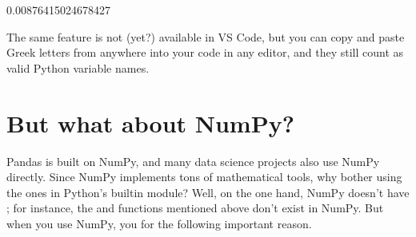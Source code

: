 \documentclass[letterpaper,10pt,english]{jupyterBook}
\begin{document}
\begin{sphinxVerbatim}[commandchars=\\\{\}]
0.00876415024678427
\end{sphinxVerbatim}

\sphinxAtStartPar
The same feature is not (yet?) available in VS Code, but you can copy and paste Greek letters from anywhere into your code in any editor, and they still count as valid Python variable names.


\section{But what about NumPy?}
\label{\detokenize{chapter-9-math-and-stats:but-what-about-numpy}}
\sphinxAtStartPar
Pandas is built on NumPy, and many data science projects also use NumPy directly.  Since NumPy implements tons of mathematical tools, why bother using the ones in Python’s built\sphinxhyphen{}in  module?  Well, on the one hand, NumPy doesn’t have ; for instance, the  and  functions mentioned above don’t exist in NumPy.  But when you  use NumPy, you  for the following important reason.
\end{document}
